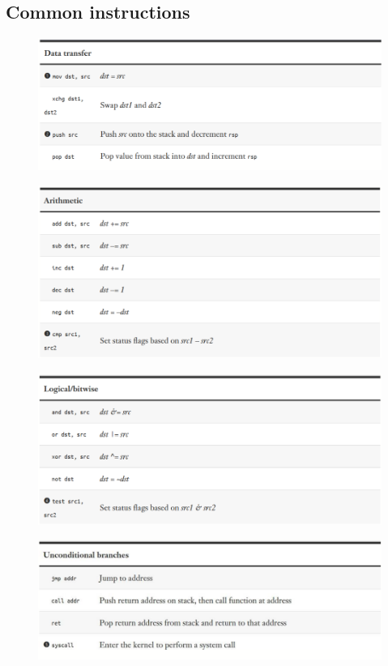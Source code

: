 \documentclass[]{project_plan}
\begin{document}
\subsection{Common instructions}
\begin{figure}[H]
  \centering
  \includegraphics[width=.8\linewidth]{common_instructions1.png}
\end{figure}
\begin{figure}[H]
  \centering
  \includegraphics[width=.8\linewidth]{common_instructions2.png}
\end{figure}
\begin{figure}[H]
  \centering
  \includegraphics[width=.8\linewidth]{common_instructions3.png}
\end{figure}
\begin{figure}[H]
  \centering
  \includegraphics[width=.8\linewidth]{common_instructions4.png}
\end{figure}
\end{document}
